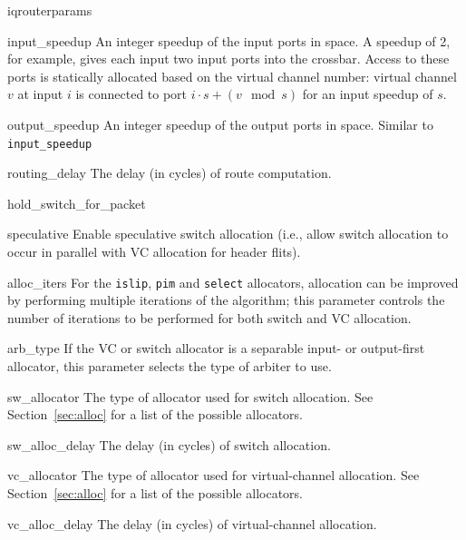 \documentclass[11pt]{article}
\begin{document}
\begin{opt_list}{iqrouterparams}

\item[input\_speedup] An integer speedup of the input ports in space.
A speedup of 2, for example, gives each input two input ports into the
crossbar.  Access to these ports is statically allocated based on the
virtual channel number: virtual channel $v$ at input $i$ is connected
to port $i \cdot s + (v \mod s)$ for an input speedup of $s$.

\item[output\_speedup] An integer speedup of the output ports in
space.  Similar to \texttt{input\_speedup}

\item[routing\_delay] The delay (in cycles) of route computation.

\item[hold\_switch\_for\_packet]

\item[speculative] Enable speculative switch allocation (i.e., allow
  switch allocation to occur in parallel with VC allocation for header
  flits). 


\item[alloc\_iters] For the \texttt{islip}, \texttt{pim} and
  \texttt{select} allocators, allocation can be improved by performing
  multiple iterations of the algorithm; this parameter controls the
  number of iterations to be performed for both switch and VC
  allocation. 

\item[arb\_type] If the VC or switch  allocator is a separable
  input- or output-first allocator, this parameter selects the type of
  arbiter to use. 

\item[sw\_allocator] The type of allocator used for switch
  allocation. See Section~\ref{sec:alloc} for a list of the possible
  allocators. 

\item[sw\_alloc\_delay] The delay (in cycles) of switch allocation.

\item[vc\_allocator] The type of allocator used for virtual-channel
allocation.  See Section~\ref{sec:alloc} for a list of the possible
allocators.

\item[vc\_alloc\_delay] The delay (in cycles) of virtual-channel
allocation.

\end{opt_list}
\end{document}
